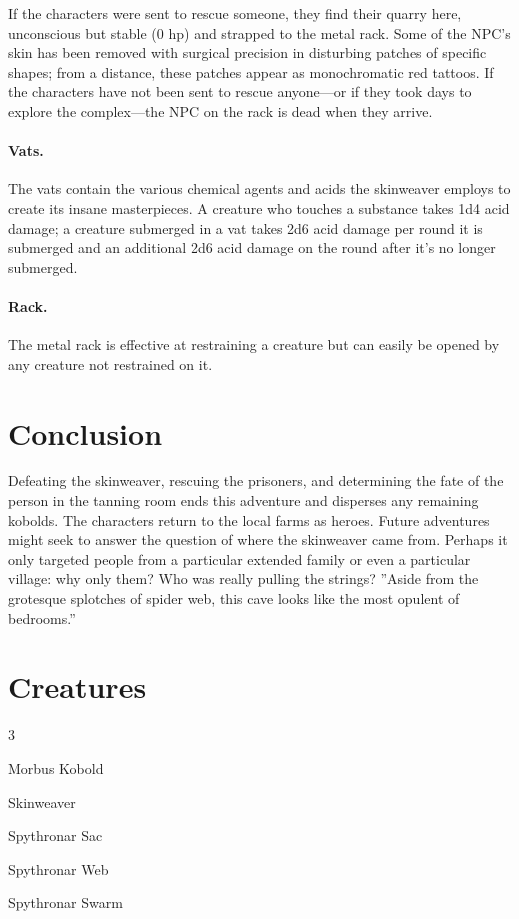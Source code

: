 \documentclass[10pt,a4paper,twoside,twocolumn,openany,bg=print,nodeprecatedcode]{dndbook}
\begin{document}
If the characters were sent to rescue someone, they find their quarry here, unconscious but stable (0 hp) and strapped to the metal rack. Some of the NPC's skin has been removed with surgical precision in disturbing patches of specific shapes; from a distance, these patches appear as monochromatic red tattoos. If the characters have not been sent to rescue anyone—or if they took days to explore the complex—the NPC on the rack is dead when they arrive.
\paragraph{Vats.}
The vats contain the various chemical agents and acids the skinweaver employs to create its insane masterpieces. A creature who touches a substance takes 1d4 acid damage; a creature submerged in a vat takes 2d6 acid damage per round it is submerged and an additional 2d6 acid damage on the round after it's no longer submerged.
\paragraph{Rack.}
The metal rack is effective at restraining a creature but can easily be opened by any creature not restrained on it.
\section{Conclusion}
Defeating the skinweaver, rescuing the prisoners, and determining the fate of the person in the tanning room ends this adventure and disperses any remaining kobolds. The characters return to the local farms as heroes. Future adventures might seek to answer the question of where the skinweaver came from. Perhaps it only targeted people from a particular extended family or even a particular village: why only them? Who was really pulling the strings?
\DndQuote%
{}
{''Aside from the grotesque splotches of spider web, this cave looks like the most opulent of bedrooms.''}
{}
\section{Creatures}

\begin{itemize}
\begin{multicols}{3}
\item Morbus Kobold
\item Skinweaver
\item Spythronar Sac
\item Spythronar Web
\item Spythronar Swarm
\end{multicols}

\end{itemize}
\end{document}
